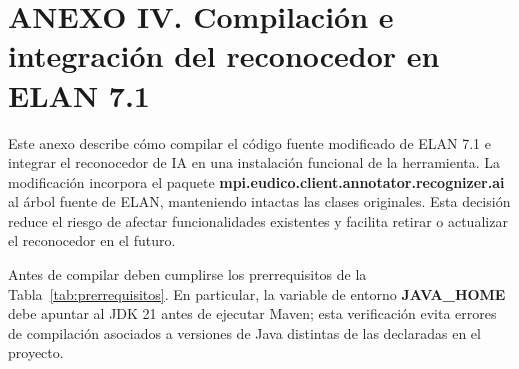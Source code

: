 \documentclass[11pt,a4paper]{article}
\begin{document}

\section*{\normalfont ANEXO IV. Compilación e integración del reconocedor en ELAN 7.1}
\label{anx:compilacion_elan}

\renewcommand{\thetable}{IV.\arabic{table}}
\renewcommand{\theHtable}{anexoIV.table.\arabic{table}}
\setcounter{table}{0}
\renewcommand{\thecodigo}{IV.\arabic{codigo}}
\renewcommand{\theHcodigo}{anexoIV.codigo.\arabic{codigo}}
\setcounter{codigo}{0}
\renewcommand{\thecomando}{IV.\arabic{comando}}
\renewcommand{\theHcomando}{anexoIV.comando.\arabic{comando}}
\setcounter{comando}{0}
\renewcommand{\thefigure}{IV.\arabic{figure}}
\renewcommand{\theHfigure}{anexoIV.figure.\arabic{figure}}
\setcounter{figure}{0}

Este anexo describe cómo compilar el código fuente modificado de ELAN 7.1 e integrar el reconocedor de IA en una instalación funcional de la herramienta. La modificación incorpora el paquete \textbf{mpi.eudico.client.annotator.recognizer.ai} al árbol fuente de ELAN, manteniendo intactas las clases originales. Esta decisión reduce el riesgo de afectar funcionalidades existentes y facilita retirar o actualizar el reconocedor en el futuro.

Antes de compilar deben cumplirse los prerrequisitos de la Tabla~\ref{tab:prerrequisitos}. En particular, la variable de entorno \textbf{JAVA\_HOME} debe apuntar al JDK 21 antes de ejecutar Maven; esta verificación evita errores de compilación asociados a versiones de Java distintas de las declaradas en el proyecto.
\end{document}
